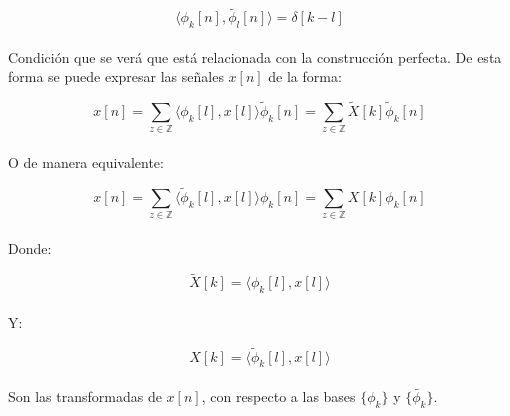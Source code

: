\begin{equation}
	\langle \phi_k[n] , \tilde{\phi_l}[n] \rangle = \delta[k - l]
	\label{eq:biortcond}
\end{equation}

\paragraph{}
Condición que se verá que está relacionada con la construcción perfecta. De esta forma se puede expresar las señales $x[n]$ de la forma:

\begin{equation}
	x[n] = \sum_{z \in \mathbb{Z}} \langle \phi_k[l] , x[l] \rangle \tilde{\phi}_{k}[n] = \sum_{z \in \mathbb{Z}} \tilde{X}[k] \tilde{\phi}_{k}[n]
\end{equation}

\paragraph{}
O de manera equivalente:

\begin{equation}
	x[n] = \sum_{z \in \mathbb{Z}} \langle \tilde{\phi}_k[l] , x[l] \rangle \phi_{k}[n] = \sum_{z \in \mathbb{Z}} X[k] \phi_{k}[n]
\end{equation}

\paragraph{}
Donde:

\begin{equation}
	\tilde{X}[k] = \langle \phi_k[l] , x[l] \rangle
\end{equation}

\paragraph{}
Y:

\begin{equation}
	X[k] = \langle \tilde{\phi}_k[l] , x[l] \rangle
\end{equation}

\paragraph{}
Son las transformadas de $x[n]$, con respecto a las bases $\{ \phi_{k} \}$ y $\{ \tilde{\phi_{k}} \}$.
